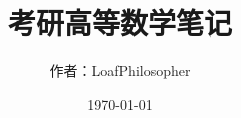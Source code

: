 \title{{\Huge{\textbf{考研高等数学笔记}}}}
\author{作者：LoafPhilosopher }
\date{\today}
\maketitle                   %
\thispagestyle{empty}        %
\newpage                      %
\pagestyle{plain}             %
\setcounter{page}{1}          %

\begin{spacing}{1.5}
	\tableofcontents
\end{spacing}           %
\newpage                      %
\pagestyle{plain}
\setcounter{page}{1}          %
